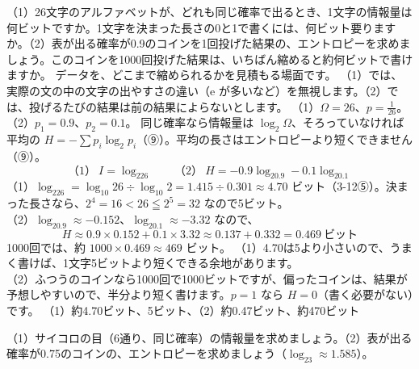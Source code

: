 \label{ph:波-11:ex11}
\begin{phreidai}[文字とコインの情報量]
（1）26文字のアルファベットが、どれも同じ確率で出るとき、1文字の情報量は何ビットですか。1文字を決まった長さの0と1で書くには、何ビット要りますか。（2）表が出る確率が0.9のコインを1回投げた結果の、エントロピーを求めましょう。このコインを1000回投げた結果は、いちばん縮めると約何ビットで書けますか。
\phbamen
データを、どこまで縮められるかを見積もる場面です。
\phmushi
（1）では、実際の文の中の文字の出やすさの違い（e が多いなど）を無視します。（2）では、投げるたびの結果は前の結果によらないとします。
\phzu
（1）$\Omega=26$、$p=\tfrac1{26}$。（2）$p_1=0.9$、$p_2=0.1$。
\phriyu
同じ確率なら情報量は $\log_2\Omega$、そろっていなければ平均の $H=-\sum p_i\log_2p_i$（⑨）。平均の長さはエントロピーより短くできません（⑨）。
\phtateru
\[（1）\ I=\log_226\qquad（2）\ H=-0.9\log_20.9-0.1\log_20.1\]
\phtoku
（1）$\log_226=\log_{10}26\div\log_{10}2=1.415\div0.301\approx4.70$ ビット（3-12⑤）。決まった長さなら、$2^4=16<26\leqq2^5=32$ なので5ビット。\\
（2）$\log_20.9\approx-0.152$、$\log_20.1\approx-3.32$ なので、\[H\approx0.9\times0.152+0.1\times3.32\approx0.137+0.332=0.469\ \text{ビット}\]
1000回では、約 $1000\times0.469\approx469$ ビット。
\phtashikame
（1）4.70は5より小さいので、うまく書けば、1文字5ビットより短くできる余地があります。\\
（2）ふつうのコインなら1000回で1000ビットですが、偏ったコインは、結果が予想しやすいので、半分より短く書けます。$p=1$ なら $H=0$（書く必要がない）です。
\kotae （1）約4.70ビット、5ビット、（2）約0.47ビット、約470ビット
\end{phreidai}
\begin{jibun}
（1）サイコロの目（6通り、同じ確率）の情報量を求めましょう。（2）表が出る確率が0.75のコインの、エントロピーを求めましょう（$\log_23\approx1.585$）。
\end{jibun}

